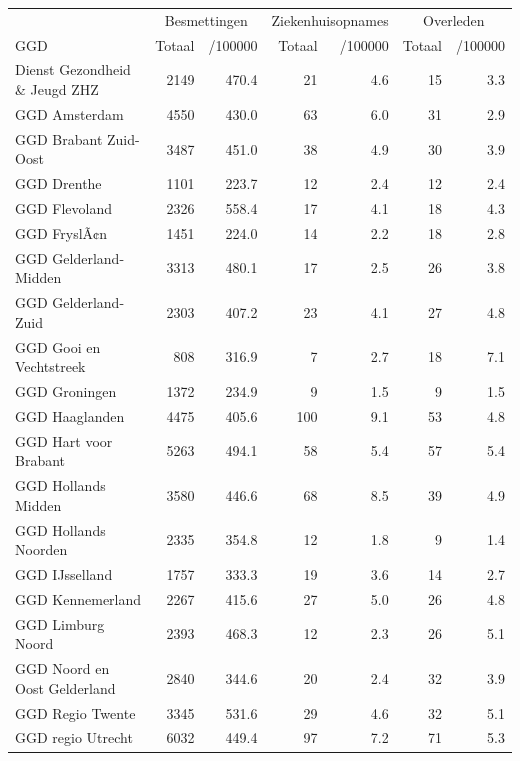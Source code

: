 \documentclass[
  english,
  man,floatsintext]{apa6}
\begin{document}
\begin{table}[H]
\centering\begingroup\fontsize{10}{12}\selectfont

\begin{threeparttable}
\begin{tabular}{lrrrrrr}
\toprule
\multicolumn{1}{c}{ } & \multicolumn{2}{c}{Besmettingen} & \multicolumn{2}{c}{Ziekenhuisopnames} & \multicolumn{2}{c}{Overleden} \\
\cmidrule(l{3pt}r{3pt}){2-3} \cmidrule(l{3pt}r{3pt}){4-5} \cmidrule(l{3pt}r{3pt}){6-7}
GGD & Totaal & /100000 & Totaal & /100000 & Totaal & /100000\\
\midrule
Dienst Gezondheid \& Jeugd ZHZ & 2149 & 470.4 & 21 & 4.6 & 15 & 3.3\\
GGD Amsterdam & 4550 & 430.0 & 63 & 6.0 & 31 & 2.9\\
GGD Brabant Zuid-Oost & 3487 & 451.0 & 38 & 4.9 & 30 & 3.9\\
GGD Drenthe & 1101 & 223.7 & 12 & 2.4 & 12 & 2.4\\
GGD Flevoland & 2326 & 558.4 & 17 & 4.1 & 18 & 4.3\\
GGD FryslÃ¢n & 1451 & 224.0 & 14 & 2.2 & 18 & 2.8\\
GGD Gelderland-Midden & 3313 & 480.1 & 17 & 2.5 & 26 & 3.8\\
GGD Gelderland-Zuid & 2303 & 407.2 & 23 & 4.1 & 27 & 4.8\\
GGD Gooi en Vechtstreek & 808 & 316.9 & 7 & 2.7 & 18 & 7.1\\
GGD Groningen & 1372 & 234.9 & 9 & 1.5 & 9 & 1.5\\
GGD Haaglanden & 4475 & 405.6 & 100 & 9.1 & 53 & 4.8\\
GGD Hart voor Brabant & 5263 & 494.1 & 58 & 5.4 & 57 & 5.4\\
GGD Hollands Midden & 3580 & 446.6 & 68 & 8.5 & 39 & 4.9\\
GGD Hollands Noorden & 2335 & 354.8 & 12 & 1.8 & 9 & 1.4\\
GGD IJsselland & 1757 & 333.3 & 19 & 3.6 & 14 & 2.7\\
GGD Kennemerland & 2267 & 415.6 & 27 & 5.0 & 26 & 4.8\\
GGD Limburg Noord & 2393 & 468.3 & 12 & 2.3 & 26 & 5.1\\
GGD Noord en Oost Gelderland & 2840 & 344.6 & 20 & 2.4 & 32 & 3.9\\
GGD Regio Twente & 3345 & 531.6 & 29 & 4.6 & 32 & 5.1\\
GGD regio Utrecht & 6032 & 449.4 & 97 & 7.2 & 71 & 5.3\\

\end{tabular}
\end{threeparttable}
\end{table}
\end{document}
